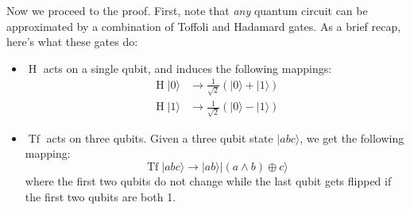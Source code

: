 \documentclass[11pt]{article}
\newcommand{\h}{\operatorname{H}}
\newcommand{\tf}{\operatorname{Tf}}
\newcommand{\ket}[1]{\lvert #1 \rangle}
\def\fill{   \hfill}
\begin{document}
\noindent Now we proceed to the proof. First, note that \emph{any} quantum circuit can be approximated by a combination of Toffoli and Hadamard gates. As a brief recap, here's what these gates do:
\begin{itemize}
\item $\h$ acts on a single qubit, and induces the following mappings:
\begin{equation*}
\begin{split}
\h\ket{0} &\rightarrow \frac{1}{\sqrt{2}}\left(\ket{0} + \ket{1}\right) \\
\h\ket{1} &\rightarrow \frac{1}{\sqrt{2}}\left(\ket{0} - \ket{1}\right)
\end{split}
\end{equation*}

\item $\tf$ acts on three qubits. Given a three qubit state $\ket{abc}$, we get the following mapping:
\begin{equation*}
\tf\ket{abc} \rightarrow \ket{ab}\ket{(a \land b) \oplus c}
\end{equation*} 
where the first two qubits do not change while the last qubit gets flipped if the first two qubits are both 1.
\end{itemize}

\fill
\end{document}
